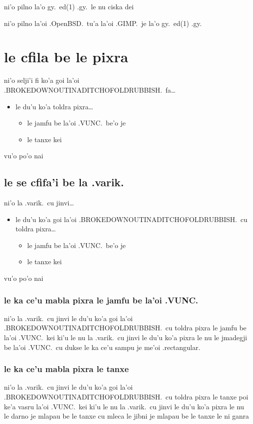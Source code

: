 \documentclass{report}
\begin{document}
ni'o pilno la'o gy.\ ed(1) .gy.\ le nu ciska dei

ni'o pilno la'oi .OpenBSD.\ tu'a la'oi .GIMP.\ je la'o gy.\ ed(1) .gy.

\section{le cfila be le pixra}
ni'o selji'i fi ko'a goi la'oi .BROKEDOWNOUTINADITCHOFOLDRUBBISH.\ fa\ldots
\begin{itemize}
	\item le du'u ko'a toldra pixra\ldots
	\begin{itemize}
		\item le jamfu be la'oi .VUNC.\ be'o je
		\item le tanxe kei
	\end{itemize}
\end{itemize}
vu'o po'o nai

\subsection{le se cfifa'i be la .varik.}
ni'o la .varik.\ cu jinvi\ldots
\begin{itemize}
	\item le du'u ko'a goi la'oi .BROKEDOWNOUTINADITCHOFOLDRUBBISH.\ cu toldra pixra\ldots
	\begin{itemize}
		\item le jamfu be la'oi .VUNC.\ be'o je
		\item le tanxe kei
	\end{itemize}
\end{itemize}
vu'o po'o nai

\subsubsection{le ka ce'u mabla pixra le jamfu be la'oi .VUNC.}
ni'o la .varik.\ cu jinvi le du'u ko'a goi la'oi .BROKEDOWNOUTINADITCHOFOLDRUBBISH.\ cu toldra pixra le jamfu be la'oi .VUNC.\ kei ki'u le nu la .varik.\ cu jinvi le du'u ko'a pixra le nu le jmadegji be la'oi .VUNC.\ cu dukse le ka ce'u sampu je me'oi .rectangular.

\subsubsection{le ka ce'u mabla pixra le tanxe}
ni'o la .varik.\ cu jinvi le du'u ko'a goi la'oi .BROKEDOWNOUTINADITCHOFOLDRUBBISH.\ cu toldra pixra le tanxe poi ke'a vasru la'oi .VUNC.\ kei ki'u le nu la .varik.\ cu jinvi le du'u ko'a pixra le nu le darno je mlapau be le tanxe cu mleca le jibni je mlapau be le tanxe le ni ganra
\end{document}
